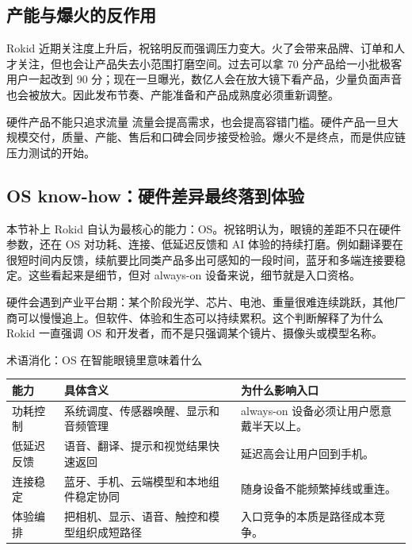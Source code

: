 \subsection{产能与爆火的反作用}

Rokid 近期关注度上升后，祝铭明反而强调压力变大。火了会带来品牌、订单和人才关注，但也会让产品失去小范围打磨空间。过去可以拿 70 分产品给一小批极客用户一起改到 90 分；现在一旦曝光，数亿人会在放大镜下看产品，少量负面声音也会被放大。因此发布节奏、产能准备和产品成熟度必须重新调整。

\begin{importantbox}{硬件产品不能只追求流量}
流量会提高需求，也会提高容错门槛。硬件产品一旦大规模交付，质量、产能、售后和口碑会同步接受检验。爆火不是终点，而是供应链压力测试的开始。
\end{importantbox}

\subsection{OS know-how：硬件差异最终落到体验}

本节补上 Rokid 自认为最核心的能力：OS。祝铭明认为，眼镜的差距不只在硬件参数，还在 OS 对功耗、连接、低延迟反馈和 AI 体验的持续打磨。例如翻译要在很短时间内反馈，续航要比同类产品多出可感知的一段时间，蓝牙和多端连接要稳定。这些看起来是细节，但对 always-on 设备来说，细节就是入口资格。

硬件会遇到产业平台期：某个阶段光学、芯片、电池、重量很难连续跳跃，其他厂商可以慢慢追上。但软件、体验和生态可以持续累积。这个判断解释了为什么 Rokid 一直强调 OS 和开发者，而不是只强调某个镜片、摄像头或模型名称。

\begin{knowledgebox}{术语消化：OS 在智能眼镜里意味着什么}
\noindent\begin{tabularx}{\textwidth}{p{}p{}X}
\toprule
能力 & 具体含义 & 为什么影响入口 \\
\midrule
功耗控制 & 系统调度、传感器唤醒、显示和音频管理 & always-on 设备必须让用户愿意戴半天以上。 \\
低延迟反馈 & 语音、翻译、提示和视觉结果快速返回 & 延迟高会让用户回到手机。 \\
连接稳定 & 蓝牙、手机、云端模型和本地组件稳定协同 & 随身设备不能频繁掉线或重连。 \\
体验编排 & 把相机、显示、语音、触控和模型组织成短路径 & 入口竞争的本质是路径成本竞争。 \\
\bottomrule
\end{tabularx}
\end{knowledgebox}

